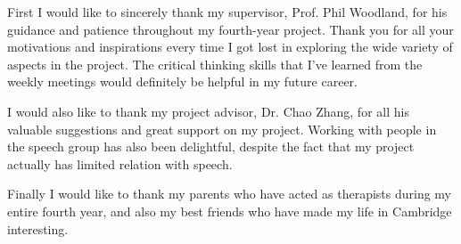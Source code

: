 
\begin{acknowledgements}      

First I would like to sincerely thank my supervisor, Prof. Phil Woodland, for his guidance and patience throughout my fourth-year project. Thank you for all your motivations and inspirations every time I got lost in exploring the wide variety of aspects in the project. The critical thinking skills that I've learned from the weekly meetings would definitely be helpful in my future career.

I would also like to thank my project advisor, Dr. Chao Zhang, for all his valuable suggestions and great support on my project. Working with people in the speech group has also been delightful, despite the fact that my project actually has limited relation with speech.

Finally I would like to thank my parents who have acted as therapists during my entire fourth year, and also my best friends who have made my life in Cambridge interesting.


\end{acknowledgements}
